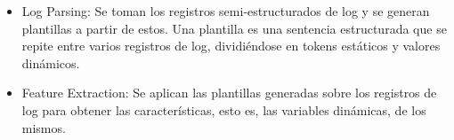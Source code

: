 \begin{itemize}
    \item Log Parsing: Se toman los registros semi-estructurados de log y se generan plantillas a partir de estos. Una plantilla es una sentencia estructurada que se repite entre varios registros de log, dividiéndose en tokens estáticos y valores dinámicos. \cite{ma2023automatic}

    \item Feature Extraction: Se aplican las plantillas generadas sobre los registros de log para obtener las características, esto es, las variables dinámicas, de los mismos. \cite{ma2023automatic}

\end{itemize}